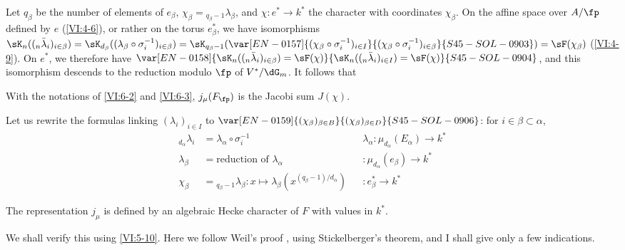 Let $q_\beta$ be the number of elements of $e_\beta$, 
  $\chi_\beta={}_{q_\beta-1}\lambda_\beta$, and 
$\chi:e^\ast \to k^\ast$ the character with coordinates $\chi_\beta$. On the 
affine space over $A/\fp$ defined by $e$ (\ref{VI:4-6}), or rather on the torus 
$e_\beta^\ast$, we have isomorphisms 
  $\sK_n((_n\bar\lambda_i)_{i\in\beta}) = \sK_{d_\beta}((\lambda_\beta \circ \sigma_i^{-1})_{i\in\beta}) =\sK_{q_\beta-1}(\var[EN-0157]{(\chi_\beta\circ \sigma_i^{-1})_{i\in I}}{(\chi_\beta\circ \sigma_i^{-1})_{i\in\beta}}{S45-SOL-0903}) = \sF(\chi_\beta)$ (\ref{VI:4-9}). 
  On $e^\ast$, we therefore have $\var[EN-0158]{\sK_n((_n\bar\lambda_i)_{i\in \beta}) = \sF(\chi)}{\sK_n((_n\bar\lambda_i)_{i\in I}) = \sF(\chi)}{S45-SOL-0904}$, 
and this isomorphism descends to the reduction modulo $\fp$ of $V^\ast/\dG_m$. 
It follows that





\begin{proposition_}\label{VI:6-4}
With the notations of \ref{VI:6-2} and \ref{VI:6-3}, $j_\mu(F_\fp)$ is the 
Jacobi sum $J(\chi)$. 
\end{proposition_}

Let us rewrite the formulas linking $(\lambda_i)_{i\in I}$ to 
  $\var[EN-0159]{(\chi_\beta)_{\beta\in B}}{(\chi_\beta)_{\beta\in D}}{S45-SOL-0906}$: for $i\in \beta\subset \alpha$, 
\begin{align*}
  _{d_\alpha} \lambda_i &= \lambda_\alpha\circ \sigma_i^{-1} && \lambda_\alpha:\mu_{d_\alpha}(E_\alpha) \to k^\ast \\
  \lambda_\beta &= \text{reduction of $\lambda_\alpha$} && :\mu_{d_\alpha}(e_\beta) \to k^\ast \\
  \chi_\beta &= {}_{q_\beta-1}\lambda_\beta: x\mapsto \lambda_\beta(x^{(q_\beta-1)/d_\alpha}) && :e_\beta^\ast \to k^\ast 
\end{align*}





\begin{theorem_}\label{VI:6-5}
The representation $j_\mu$ is defined by an algebraic Hecke character 
of $F$ with values in $k^\ast$. 
\end{theorem_}

We shall verify this using \ref{VI:5-10}. Here we follow Weil's 
proof , using Stickelberger's theorem, 
and I shall give only a few indications. 





